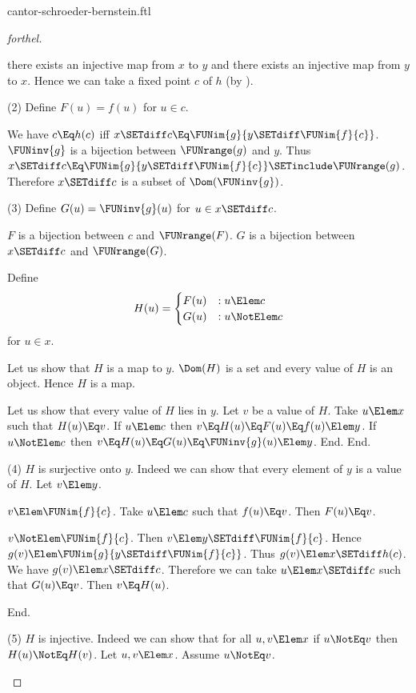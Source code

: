 \documentclass{stex}
\begin{document}
\begin{smodule}{cantor-schroeder-bernstein.ftl}
\begin{proof}[forthel]
\begin{case}{there exists an injective map from $x$ to $y$ and there exists an injective map from $y$ to $x$.}
    Hence we can take a fixed point $c$ of $h$ (by ).

    (2) Define $F(u) = f(u)$ for $u \in c$.

    We have $c \Eq h(c)$ iff $x \SETdiff c \Eq \FUNim{g}{y \SETdiff \FUNim{f}{c}}$.
    $\FUNinv{g}$ is a bijection between $\FUNrange(g)$ and $y$.
    Thus $x \SETdiff c \Eq \FUNim{g}{y \SETdiff \FUNim{f}{c}} \SETinclude \FUNrange(g)$.
    Therefore $x \SETdiff c$ is a subset of $\Dom(\FUNinv{g})$.

    (3) Define $G(u) = \FUNinv{g}(u)$ for $u \in x \SETdiff c$.

    $F$ is a bijection between $c$ and $\FUNrange(F)$.
    $G$ is a bijection between $x \SETdiff c$ and $\FUNrange(G)$.

    Define \[ H(u) =
      \begin{cases}
        F(u) & : u \Elem c \\
        G(u) & : u \NotElem c
      \end{cases} \]
    for $u \in x$.

    Let us show that $H$ is a map to $y$.
      $\Dom(H)$ is a set and every value of $H$ is an object.
      Hence $H$ is a map.

      Let us show that every value of $H$ lies in $y$.
        Let $v$ be a value of $H$.
        Take $u \Elem x$ such that $H(u) \Eq v$.
        If $u \Elem c$ then $v \Eq H(u) \Eq F(u) \Eq f(u) \Elem y$.
        If $u \NotElem c$ then $v \Eq H(u) \Eq G(u) \Eq \FUNinv{g}(u) \Elem y$.
      End.
    End.

    (4) $H$ is surjective onto $y$.
    Indeed we can show that every element of $y$ is a value of $H$.
      Let $v \Elem y$.

      \begin{case}{$v \Elem \FUNim{f}{c}$.}
        Take $u \Elem c$ such that $f(u) \Eq v$.
        Then $F(u) \Eq v$.
      \end{case}

      \begin{case}{$v \NotElem \FUNim{f}{c}$.}
        Then $v \Elem y \SETdiff \FUNim{f}{c}$.
        Hence $g(v) \Elem \FUNim{g}{y \SETdiff \FUNim{f}{c}}$.
        Thus $g(v) \Elem x \SETdiff h(c)$.
        We have $g(v) \Elem x \SETdiff c$.
        Therefore we can take $u \Elem x \SETdiff c$ such that $G(u) \Eq v$.
        Then $v \Eq H(u)$.
      \end{case}
    End.

    (5) $H$ is injective.
    Indeed we can show that for all $u, v \Elem x$ if $u \NotEq v$ then $H(u) \NotEq H(v)$.
      Let $u,v \Elem x$.
      Assume $u \NotEq v$.


\end{case}
\end{proof}
\end{smodule}
\end{document}
